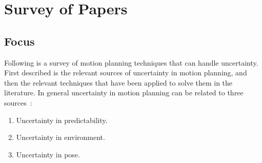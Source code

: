 \chapter{Survey of Papers}
\label{chp:survey-of-papers}

\section{Focus}
Following is a survey of motion planning techniques that can handle uncertainty.
First described is the relevant sources of uncertainty in motion planning, and
then the relevant techniques that have been applied to solve them in the
literature. In general uncertainty in motion planning can be related to three
sources~\cite{lavalleFrameworkMotionPlanning1995}:
\begin{enumerate}
\item Uncertainty in predictability.
\item Uncertainty in environment.
\item Uncertainty in pose.
\end{enumerate}

